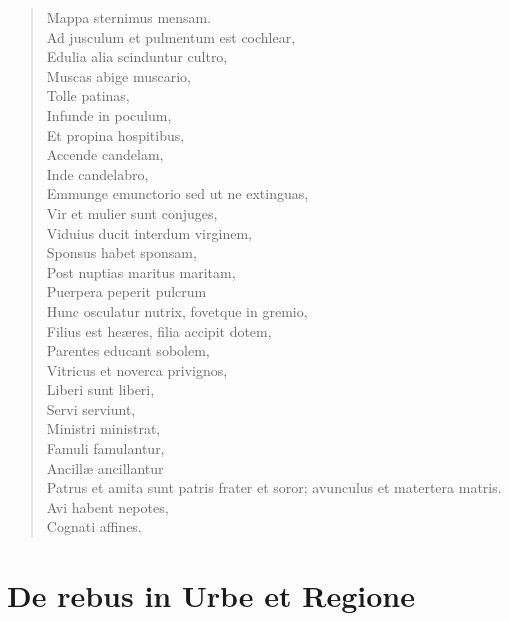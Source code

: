 \documentclass[12pt,  postvopaper]{memoir}
\begin{document}
\begin{verse}
  Mappa sternimus mensam.\\
  Ad jusculum et pulmentum est cochlear,\\
  Edulia alia scinduntur cultro,\\
  Muscas abige muscario,\\
  Tolle patinas,\\
  Infunde in poculum,\\
  Et propina hospitibus,\\
  Accende candelam,\\
  Inde candelabro,\\
  Emmunge emunctorio sed ut ne extinguas,\\
  Vir et mulier sunt conjuges,\\
  Viduius ducit interdum virginem,\\
  Sponsus habet sponsam,\\
  Post nuptias maritus maritam,\\
  Puerpera peperit pulcrum\\
  Hunc osculatur nutrix, fovetque in gremio,\\
  Filius est heæres, filia accipit dotem,\\
  Parentes educant sobolem,\\
  Vitricus et noverca privignos,\\
  Liberi sunt liberi,\\
  Servi serviunt,\\
  Ministri ministrat,\\
  Famuli famulantur,\\
  Ancillæ ancillantur\\
  Patrus et amita sunt patris frater et soror; avunculus et matertera matris.\\
  Avi habent nepotes,\\
  Cognati affines.\\
\end{verse}


\chapter{De rebus in Urbe et Regione}
\end{document}
